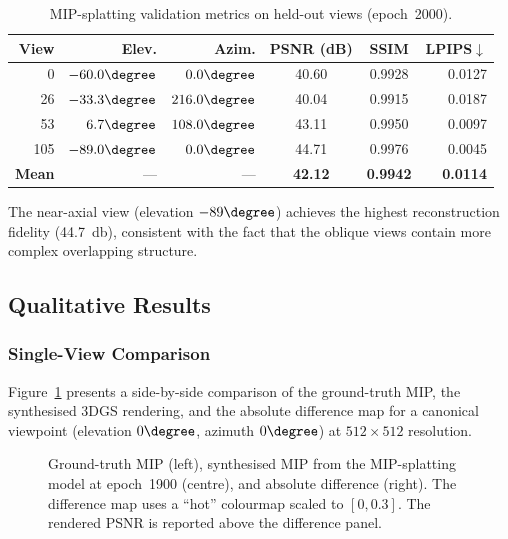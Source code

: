 \begin{table}[htbp]
  \centering
  \caption{%
    MIP-splatting validation metrics on held-out views
    (epoch~2000).%
  }
  \label{tab:validation}
  \begin{tabular}{rrrccr}
    \toprule
    \textbf{View} & \textbf{Elev.} & \textbf{Azim.} &
    \textbf{PSNR (dB)} & \textbf{SSIM} & \textbf{LPIPS}$\downarrow$ \\
    \midrule
    0   & $-60.0\degree$ & $0.0\degree$   & 40.60 & 0.9928 & 0.0127 \\
    26  & $-33.3\degree$ & $216.0\degree$  & 40.04 & 0.9915 & 0.0187 \\
    53  & $\phantom{-}6.7\degree$  & $108.0\degree$  & 43.11 & 0.9950 & 0.0097 \\
    105 & $-89.0\degree$ & $0.0\degree$   & 44.71 & 0.9976 & 0.0045 \\
    \midrule
    \textbf{Mean} & --- & --- & \textbf{42.12} & \textbf{0.9942} & \textbf{0.0114} \\
    \bottomrule
  \end{tabular}
\end{table}

The near-axial view (elevation $-89\degree$) achieves the highest
reconstruction fidelity (\SI{44.7}{\decibel}), consistent with the
fact that the oblique views contain more complex overlapping structure.

\subsection{Qualitative Results}
\label{sec:exp-qualitative}

\subsubsection{Single-View Comparison}
Figure~\ref{fig:single-view} presents a side-by-side comparison of the
ground-truth MIP, the synthesised 3DGS rendering, and the absolute
difference map for a canonical viewpoint (elevation $0\degree$,
azimuth $0\degree$) at $512\times512$ resolution.

\begin{figure}[htbp]
  \centering
  \caption{%
    Ground-truth MIP (left), synthesised MIP from the MIP-splatting
    model at epoch~1900 (centre), and absolute difference (right).
    The difference map uses a ``hot'' colourmap scaled to $[0, 0.3]$.
    The rendered PSNR is reported above the difference panel.%
  }
  \label{fig:single-view}
\end{figure}

